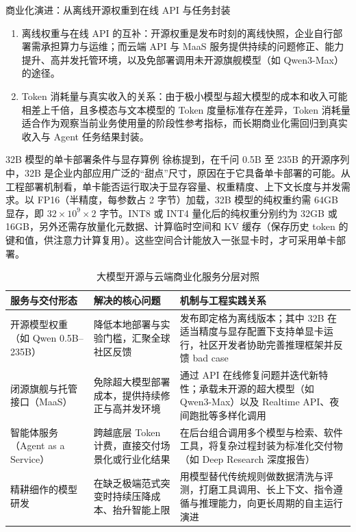 \documentclass[UTF8,a4paper,11pt,fontset=fandol]{ctexart}
\begin{document}
\begin{warningbox}{商业化演进：从离线开源权重到在线 API 与任务封装}
\begin{enumerate}
\item 离线权重与在线 API 的互补：开源权重是发布时刻的离线快照，企业自行部署需承担算力与运维；而云端 API 与 MaaS 服务提供持续的问题修正、能力提升、高并发托管环境，以及免部署调用未开源旗舰模型（如 Qwen3-Max）的途径。
\item Token 消耗量与真实收入的关系：由于极小模型与超大模型的成本和收入可能相差上千倍，且多模态与文本模型的 Token 度量标准存在差异，Token 消耗量适合作为观察当前业务使用量的阶段性参考指标，而长期商业化需回归到真实收入与 Agent 任务结果封装。
\end{enumerate}
\end{warningbox}
\begin{knowledgebox}{32B 模型的单卡部署条件与显存算例}
徐栋提到，在千问 0.5B 至 235B 的开源序列中，32B 是企业内部应用广泛的“甜点”尺寸，原因在于它具备单卡部署的可能。从工程部署机制看，单卡能否运行取决于显存容量、权重精度、上下文长度与并发需求。以 FP16（半精度，每参数占 2 字节）加载，32B 模型的纯权重约需 64GB 显存，即 \(32\times10^9\times2\) 字节。INT8 或 INT4 量化后的纯权重分别约为 32GB 或 16GB，另外还需存放量化元数据、计算临时空间和 KV 缓存（保存历史 token 的键和值，供注意力计算复用）。这些空间合计能放入一张显卡时，才可采用单卡部署。
\end{knowledgebox}
\begin{table}[H]\centering\small
\caption{大模型开源与云端商业化服务分层对照}
\begin{tabular}{>{\raggedright\arraybackslash}p{\dimexpr(\linewidth-6\tabcolsep)/3\relax}>{\raggedright\arraybackslash}p{\dimexpr(\linewidth-6\tabcolsep)/3\relax}>{\raggedright\arraybackslash}p{\dimexpr(\linewidth-6\tabcolsep)/3\relax}}
\toprule
服务与交付形态 & 解决的核心问题 & 机制与工程实践关系\\\midrule
开源模型权重（如 Qwen 0.5B–235B） & 降低本地部署与实验门槛，汇聚全球社区反馈 & 发布即定格为离线版本；其中 32B 在适当精度与显存配置下支持单显卡运行，社区开发者协助完善推理框架并反馈 bad case\\[4pt]
闭源旗舰与托管接口（MaaS） & 免除超大模型部署成本，提供持续修正与高并发环境 & 通过 API 在线修复问题并迭代新特性；承载未开源的超大模型（如 Qwen3-Max）以及 Realtime API、夜间跑批等多样化调用\\[4pt]
智能体服务（Agent as a Service） & 跨越底层 Token 计费，直接交付场景化或行业化结果 & 在后台组合调用多个模型与检索、软件工具，将复杂过程封装为标准化交付物（如 Deep Research 深度报告）\\[4pt]
精耕细作的模型研发 & 在缺乏极端范式突变时持续压降成本、抬升智能上限 & 用模型替代传统规则做数据清洗与评测，打磨工具调用、长上下文、指令遵循与推理能力，向更长周期的自主运行演进\\[4pt]
\bottomrule\end{tabular}\end{table}
\end{document}
